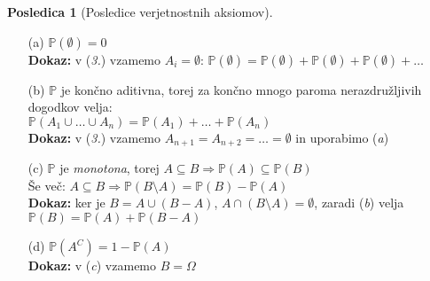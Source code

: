 \documentclass[11pt]{article}
\theoremstyle{definition}
\theoremstyle{definition}
\theoremstyle{definition}
\newtheorem*{posledica}{Posledica}
\begin{document}
\begin{posledica}[Posledice verjetnostnih aksiomov]
~
\begin{enumerate}

\item[(a)] $\mathbb{P}(\emptyset) = 0$ \\
\textbf{Dokaz:} v (\textit{3.}) vzamemo $A_i = \emptyset$: 
$\mathbb{P}(\emptyset) = \mathbb{P}(\emptyset) + \mathbb{P}(\emptyset) + \mathbb{P}(\emptyset) + \ldots$

\item[(b)] $\mathbb{P}$ je končno aditivna, torej za končno mnogo paroma nerazdružljivih dogodkov velja: \\
$\mathbb{P}(A_1 \cup \ldots \cup A_n) = \mathbb{P}(A_1) + \ldots + \mathbb{P}(A_n)$ \\
\textbf{Dokaz:} v (\textit{3.}) vzamemo $A_{n+1} = A_{n+2} = \ldots = \emptyset$ in uporabimo (\textit{a})

\item[(c)] $\mathbb{P}$ je \textit{monotona}, torej $A \subseteq B \Rightarrow \mathbb{P}(A) \subseteq \mathbb{P}(B)$ \\
Še več: $A \subseteq B \Rightarrow \mathbb{P}(B \setminus A) = \mathbb{P}(B) - \mathbb{P}(A)$ \\
\textbf{Dokaz:} ker je $B = A \cup (B-A)$, $A \cap (B \setminus A) = \emptyset$, zaradi (\textit{b}) velja $\mathbb{P}(B) = \mathbb{P}(A) + \mathbb{P}(B-A)$

\item[(d)] $\mathbb{P}(A^C) = 1 - \mathbb{P}(A)$ \\
\textbf{Dokaz:} v (\textit{c}) vzamemo $B = \Omega$


\end{enumerate}
\end{posledica}
\end{document}

